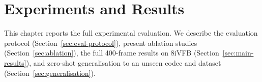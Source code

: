 \chapter{Experiments and Results}
\label{ch:results}

This chapter reports the full experimental evaluation.
We describe the evaluation protocol (Section~\ref{sec:eval-protocol}),
present ablation studies (Section~\ref{sec:ablation}),
the full 400-frame results on 8iVFB (Section~\ref{sec:main-results}),
and zero-shot generalisation to an unseen codec and dataset
(Section~\ref{sec:generalisation}).







